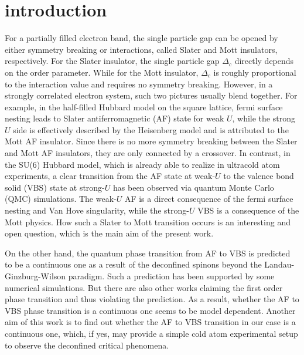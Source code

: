 \documentclass[twocolumn,superscriptaddress,prb]{revtex4-1}
\begin{document}
\section{introduction}
For a partially filled electron band, the single particle gap can be opened by either symmetry breaking or interactions, called Slater \cite{Slater_PR_1951} and Mott \cite{Mott_PPSA_1949} insulators, respectively. For the Slater insulator, the single particle gap $\Delta_c$ directly depends on the order parameter. While for the Mott insulator, $\Delta_c$ is roughly proportional to the interaction value and requires no symmetry breaking. However, in a strongly correlated electron system, such two pictures usually blend together. \cite{Imada_RMP_1998,Lee_RMP_2006} For example, in the half-filled Hubbard model on the square lattice, fermi surface nesting leads to Slater antiferromagnetic (AF) state for weak $U$, while the strong $U$ side is effectively described by the Heisenberg model and is attributed to the Mott AF insulator. \cite{Hirsch_PRB_1985} Since there is no more symmetry breaking between the Slater and Mott AF insulators, they are only connected by a crossover. \cite{Pruschke_JPCM_2003} In contrast, in the SU(6) Hubbard model, which is already able to realize in ultracold atom experiments, \cite{Wu_PRL_2003,*Wu_MPLB_2006,Honerkamp_PRL_2004,Assaad_PRB_2005,DeSalvo_PRL_2010,*Taie_PRL_2010,Krauser_NP_2012,*Taie_NP_2012,*Zhang_S_2014,Cazalilla_RPP_2014,*Laflamme_AP_2016} a clear transition from the AF state at weak-$U$ to the valence bond solid (VBS) state at strong-$U$ has been observed via quantum Monte Carlo (QMC) simulations. \cite{Wang_PRL_2014} The weak-$U$ AF is a direct consequence of the fermi surface nesting and Van Hove singularity, while the strong-$U$ VBS is a consequence of the Mott physics. \cite{Zhou_PRB_2016} How such a Slater to Mott transition occurs is an interesting and open question, which is the main aim of the present work.

On the other hand, the quantum phase transition from AF to VBS is predicted to be a continuous one as a result of the deconfined spinons beyond the Landau-Ginzburg-Wilson paradigm. \cite{Senthil_S_2004,*Senthil_PRB_2004,*Levin_PRB_2004} Such a prediction has been supported by some numerical simulations. \cite{Sandvik_PRL_2007,*Melko_PRL_2008,*Sandvik_PRL_2010,*Kaul_PRL_2012,*Pujari_PRL_2013,*Shao_S_2016,*Nahum_PRX_2015,*Wang_PRB_2016,*Assaad_PRX_2016} But there are also other works claiming the first order phase transition and thus violating the prediction. \cite{Kragset_PRL_2006,*Kuklov_AP_2006,*Kuklov_PRL_2008,*Sen_PRB_2010,*Papanikolaou_PRL_2010,*Block_PRL_2013,*DEmidio_PRB_2016,*DEmidio_PRL_2017} As a result, whether the AF to VBS phase transition is a continuous one seems to be model dependent. Another aim of this work is to find out whether the AF to VBS transition in our case is a continuous one, which, if yes, may provide a simple cold atom experimental setup to observe the deconfined critical phenomena. 
\end{document}
